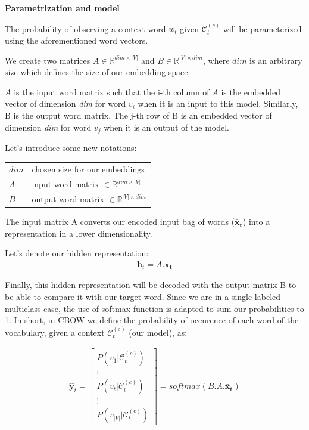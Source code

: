 \textbf{Parametrization and model}

The probability of observing a context word $w_t$ given $\mathcal{C}_t^{(c)}$ will be parameterized using the aforementioned word vectors.

We create two matrices $A \in \mathbb{R}^{dim \times |V|}$ and $B \in \mathbb{R}^{|V| \times dim}$, where $dim$ is an arbitrary size which defines the size of our embedding space.

$A$ is the input word matrix such that the i-th column of $A$ is the embedded vector of dimension \textit{dim} for word $v_{i}$ when it is an input to this model. 
Similarly, B is the output word matrix. The j-th row of B is an embedded vector of dimension \textit{dim} for word $v_j$ when it is an output of the model. 


Let's introduce some new notations:

{\ttfamily
\begin{table}[H]
    \centering
    \begin{tabular}{ll}
        \toprule
        $dim$ 				& chosen size for our embeddings \\
        $A$ 				& input word matrix $\in \mathbb{R}^{dim \times |V|}$ \\
        $B$ 				& output word matrix $\in \mathbb{R}^{|V| \times dim}$ \\
        \bottomrule
    \end{tabular}
\end{table}
}

The input matrix A converts our encoded input bag of words ($\mathbf{\bar x_t} $) into a representation in a lower dimensionality.

Let's denote our hidden representation:
\begin{align}
 \mathbf{h}_t = A.\mathbf{\bar x_t}
\end{align}

Finally, this hidden representation will be decoded with the output matrix B to be able to compare it with our target word. Since we are in a single labeled multiclass case, the use of softmax function is adapted to sum our probabilities to 1. In short, in CBOW we define the probability of occurence of each word of the vocabulary, given a context $\mathcal{C}_t^{(c)}$ (our model), as:

\begin{align}
 \mathbf{\hat y}_t = 
	\begin{bmatrix} 
		P(v_1 | \mathcal{C}_t^{(c)}) \\
		\vdots \\
		P(v_t | \mathcal{C}_t^{(c)})\\
		\vdots \\
		P(v_{|V|} | \mathcal{C}_t^{(c)})
	\end{bmatrix} = 
	softmax(B.A.\mathbf{\bar x_t} )
\end{align}

